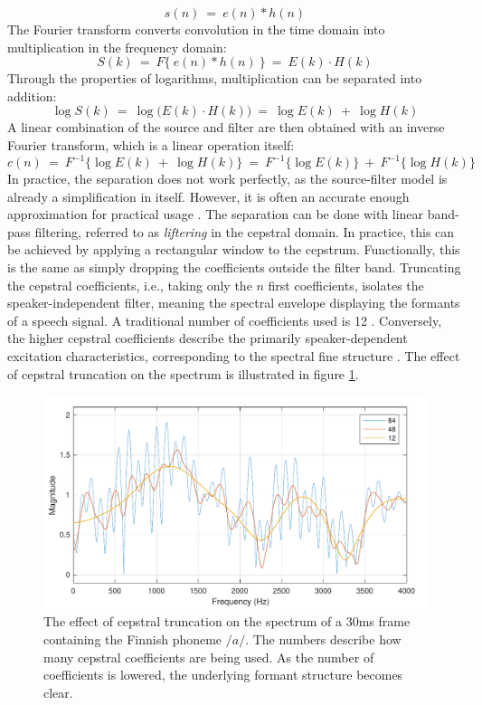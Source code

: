 \documentclass[english, 12pt, a4paper, pdftex, elec, utf8]{aaltothesis}
\begin{document}
\begin{equation}
s(n) \ = \ e(n) * h(n)
\end{equation}
The Fourier transform converts convolution in the time domain into multiplication in the frequency domain:
\begin{equation}
S(k) \ = \ F\big\{ \ e(n) * h(n) \ \big\} \ = \ E(k) \cdot H(k)
\end{equation}
Through the properties of logarithms, multiplication can be separated into addition:
\begin{equation}
\log S(k) \ = \ \log \big( E(k) \cdot H(k) \big) \ = \ \log E(k) \ + \ \log H(k)
\end{equation}
A linear combination of the source and filter are then obtained with an inverse Fourier transform, which is a linear operation itself:
\begin{equation}
c(n) \ = \ F^{-1} \big\{ \log E(k) \ + \ \log H(k) \big\} \ = \ F^{-1} \big\{\log  E(k) \big\} \ + \ F^{-1} \big\{\log H(k) \big\}
\end{equation}
In practice, the separation does not work perfectly, as the source-filter model is already a simplification in itself. However, it is often an accurate enough approximation for practical usage \cite[p.~314]{huang2001spoken}. The separation can be done with linear band-pass filtering, referred to as \textit{liftering} in the cepstral domain. In practice, this can be achieved by applying a rectangular window to the cepstrum. Functionally, this is the same as simply dropping the coefficients outside the filter band. Truncating the cepstral coefficients, i.e., taking only the $n$ first coefficients, isolates the speaker-independent filter, meaning the spectral envelope displaying the formants of a speech signal. A traditional number of coefficients used is 12 \cite{huang2001spoken, gales2008application}. Conversely, the higher cepstral coefficients describe the primarily speaker-dependent excitation characteristics, corresponding to the spectral fine structure \cite{gales2008application}. The effect of cepstral truncation on the spectrum is illustrated in figure \ref{fig:cepstrum}.
\begin{figure}[h]
	\centering
	\includegraphics[width=\textwidth]{cepstrum.pdf}
	\caption{The effect of cepstral truncation on the spectrum of a 30ms frame containing the Finnish phoneme $/a/$. The numbers describe how many cepstral coefficients are being used. As the number of coefficients is lowered, the underlying formant structure becomes clear.}
	\label{fig:cepstrum} 
\end{figure} \\
\end{document}

